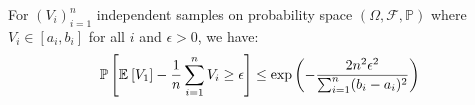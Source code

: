 %
\begin{lemma}
    For $(V_i)_{i = 1}^{n}$ independent samples on probability space $(\Omega, \mathcal{F}, \mathbb{P})$ where $V_i \in [a_i, b_i]$ for all $i$ and $\epsilon > 0$, we have:
    \begin{equation*}
        \mathbb{P}\left[ {\mathbb{E}_{}\left[ {V_1} \right] - \frac 1n \sum_{i=1}^{n} V_i \geq \epsilon} \right] \leq \exp{\left(- \frac{2n^2\epsilon^2}{\sum_{i = 1}^{n}(b_i - a_i)^2}\right)}
    \end{equation*}
\end{lemma}
%

